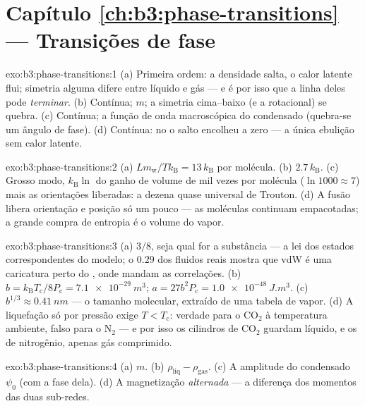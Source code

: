 \section*{Capítulo \ref{ch:b3:phase-transitions} --- Transições de fase}

\begin{solution}{exo:b3:phase-transitions:1}
(a) Primeira ordem: a densidade salta, o calor latente flui; simetria
alguma difere entre líquido e gás --- e é por isso que a linha deles
pode \emph{terminar}. (b) Contínua;  $m$; a simetria
cima--baixo (e a rotacional) se quebra. (c) Contínua; a função de onda
macroscópica do condensado (quebra-se um ângulo de fase). (d) Contínua:
no  o salto encolheu a zero --- a única
ebulição sem calor latente.
\end{solution}

\begin{solution}{exo:b3:phase-transitions:2}
(a) $Lm_{\text{w}}/Tk_{\text{B}} = 13\,k_{\text{B}}$ por molécula.
(b) $2.7\,k_{\text{B}}$. (c) Grosso modo, $k_{\text{B}}\ln$ do
ganho de volume de mil vezes por molécula ($\ln1000 \approx 7$) mais
as orientações liberadas: a dezena quase universal de Trouton. (d)
A fusão libera orientação e posição só um pouco --- as
moléculas continuam empacotadas; a grande compra de entropia é o
volume do vapor.
\end{solution}

\begin{solution}{exo:b3:phase-transitions:3}
(a) $3/8$, seja qual for a substância --- a lei dos estados
correspondentes do modelo; o $0.29$ dos fluidos reais mostra que vdW é
uma caricatura perto do , onde mandam as correlações. (b) $b =
k_{\text{B}}T_{\text{c}}/8P_{\text{c}} = \qty{7.1e-29}{m^3}$; $a =
27b^2P_{\text{c}} = \qty{1.0e-48}{J.m^3}$. (c) $b^{1/3} \approx
\qty{0.41}{nm}$ --- o tamanho molecular, extraído de uma tabela
de vapor. (d) A liquefação só por pressão exige $T <
T_{\text{c}}$: verdade para o CO$_2$ à temperatura ambiente, falso para
o N$_2$ --- e por isso os cilindros de CO$_2$ guardam líquido, e os de
nitrogênio, apenas gás comprimido.
\end{solution}

\begin{solution}{exo:b3:phase-transitions:4}
(a) $m$. (b) $\rho_{\text{liq}} - \rho_{\text{gas}}$. (c) A
amplitude do condensado $\psi_0$ (com a fase dela). (d) A
magnetização \emph{alternada} --- a diferença dos momentos das duas
sub-redes.
\end{solution}

